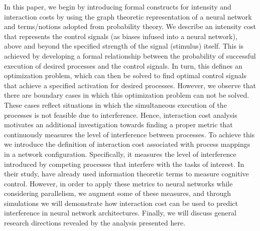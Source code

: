 \documentclass[10pt,letterpaper]{article}
\begin{document}
In this paper, we begin by introducing formal constructs for intensity and interaction costs by using the graph theoretic representation of a neural network and terms/notions adopted from probability theory. We describe an intensity cost that represents the control signals (as biases infused into a neural network), above and beyond the specified strength of the signal (stimulus) itself. This is achieved by developing a formal relationship between the probability of successful execution of desired processes and the control signals. 
In turn, this defines an optimization problem, which can then be solved to find optimal control signals that achieve a specified activation for desired processes. However, we observe that there are boundary cases in which this optimization problem can not be solved. These cases reflect situations in which the simultaneous execution of the processes is not feasible due to interference. Hence, interaction cost analysis motivates an additional investigation towards finding a proper metric that continuously measures the level of interference between processes. To achieve this we introduce the definition of interaction cost associated with process mappings in a network configuration. Specifically, it measures the level of interference introduced by competing processes that interfere with the tasks of interest. In their study,  have already used information theoretic terms to measure cognitive control. However, in order to apply these metrics to neural networks while considering parallelism, we augment some of these measures, and through simulations we will demonstrate how interaction cost can be used to predict interference in neural network architectures. Finally, we will discuss general research directions revealed by the analysis presented here.
%
%
%

%
%
\end{document}
